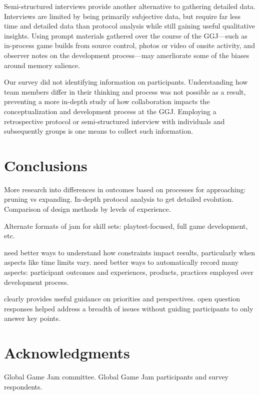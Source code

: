 \documentclass{sig-alternate}
\begin{document}
Semi-structured interviews provide another alternative to gathering detailed data. Interviews are limited by being primarily subjective data, but require far less time and detailed data than protocol analysis while still gaining useful qualitative insights. Using prompt materials gathered over the course of the GGJ---such as in-process game builds from source control, photos or video of onsite activity, and observer notes on the development process---may amerliorate some of the biases around memory salience.

Our survey did not identifying information on participants. Understanding how team members differ in their thinking and process was not possible as a result, preventing a more in-depth study of how collaboration impacts the conceptualization and development process at the GGJ. Employing a retrospective protocol or semi-structured interview with individuals and subsequently groups is one means to collect such information.


\section{Conclusions}
More research into differences in outcomes based on processes for approaching: pruning vs expanding. In-depth protocol analysis to get detailed evolution. Comparison of design methods by levels of experience.

Alternate formats of jam for skill sets: playtest-focused, full game development, etc.

need better ways to understand how constraints impact results, particularly when aspects like time limits vary. need better ways to automatically record many aspects: participant outcomes and experiences, products, practices employed over development process.

clearly provides useful guidance on priorities and perspectives. open question responses helped address a breadth of issues without guiding participants to only answer key points.

\section{Acknowledgments}
Global Game Jam committee. Global Game Jam participants and survey respondents.




\end{document}
